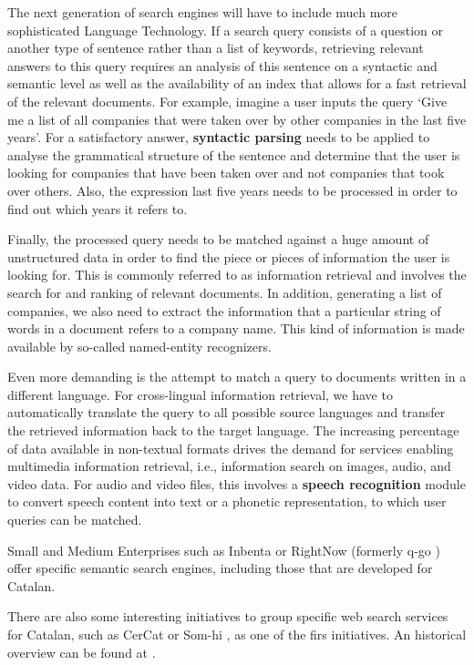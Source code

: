 \begin{multicols}{2}
The next generation of search engines will have to include much more sophisticated Language Technology. If a search query consists of a question or another type of sentence rather than a list of keywords, retrieving relevant answers to this query requires an analysis of this sentence on a syntactic and semantic level as well as the availability of an index that allows for a fast retrieval of the relevant documents. For example, imagine a user inputs the query ‘Give me a list of all companies that were taken over by other companies in the last five years’. For a satisfactory answer, \textbf{syntactic parsing} needs to be applied to analyse the grammatical structure of the sentence and determine that the user is looking for companies that have been taken over and not companies that took over others. Also, the expression last five years needs to be processed in order to find out which years it refers to. 

Finally, the processed query needs to be matched against a huge amount of unstructured data in order to find the piece or pieces of information the user is looking for. This is commonly referred to as information retrieval and involves the search for and ranking of relevant documents. In addition, generating a list of companies, we also need to extract the information that a particular string of words in a document refers to a company name. This kind of information is made available by so-called named-entity recognizers. 

Even more demanding is the attempt to match a query to documents written in a different language. For cross-lingual information retrieval, we have to automatically translate the query to all possible source languages and transfer the retrieved information back to the target language. The increasing percentage of data available in non-textual formats drives the demand for services enabling multimedia information retrieval, i.e., information search on images, audio, and video data. For audio and video files, this involves a \textbf{speech recognition} module to convert speech content into text or a phonetic representation, to which user queries can be matched.

Small and Medium Enterprises such as Inbenta \cite{CAT-inbenta} or RightNow (formerly q-go \cite{CAT-rightnow}) offer specific semantic search engines, including those that are developed for Catalan.

There are also some interesting initiatives to group specific web search services for Catalan, such as CerCat or Som-hi \cite{CAT-cercadors}, as one of the firs initiatives. An historical overview can be found at \cite{CAT-Resum-sobre-cercadors}.


\end{multicols}
